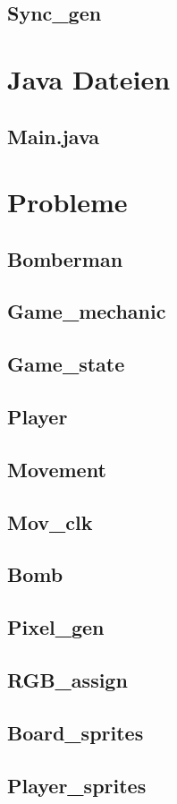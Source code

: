 \documentclass[parskip=full]{scrartcl}
\begin{document}
		\subsection{Sync\_gen}
		
	\section{Java Dateien}
		\subsection{Main.java}
		
	\section{Probleme}
		\subsection{Bomberman}
		
		\subsection{Game\_mechanic}
		
		\subsection{Game\_state}
		
		\subsection{Player}
		
		\subsection{Movement}
		
		\subsection{Mov\_clk}
		
		\subsection{Bomb}
		
		\subsection{Pixel\_gen}
		
		\subsection{RGB\_assign}
		
		\subsection{Board\_sprites}
		
		\subsection{Player\_sprites}
		
\end{document}
